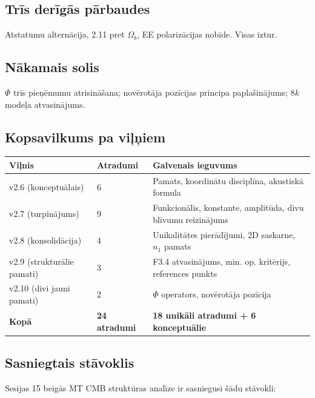 \documentclass[12pt,a4paper]{article}
\begin{document}
\subsection*{Trīs derīgās pārbaudes}

Atstatumu alternācija, 2.11 pret $\Omega_b$, EE polarizācijas nobīde. Visas iztur.

\subsection*{Nākamais solis}

$\Phi$ trīs pieņēmumu atrisināšana; novērotāja pozīcijas principa paplašinājums; $8k$ modeļa atvasinājums.

\subsection*{Kopsavilkums pa viļņiem}

\begin{table}[h]
\centering
\begin{tabular}{|l|l|l|}
\hline
\textbf{Viļnis} & \textbf{Atradumi} & \textbf{Galvenais ieguvums} \\
\hline
v2.6 (konceptuālais) & 6 & Pamats, koordinātu disciplīna, akustiskā formula \\
v2.7 (turpinājums) & 9 & Funkcionālis, konstante, amplitūda, divu blīvumu reizinājums \\
v2.8 (konsolidācija) & 4 & Unikalitātes pierādījumi, 2D saskarne, $n_1$ pamats \\
v2.9 (strukturālie pamati) & 3 & F3.4 atvasinājums, min. op. kritērijs, references punkts \\
v2.10 (divi jauni pamati) & 2 & $\Phi$ operators, novērotāja pozīcija \\
\hline
\textbf{Kopā} & \textbf{24 atradumi} & \textbf{18 unikāli atradumi + 6 konceptuālie} \\
\hline
\end{tabular}
\end{table}

\subsection*{Sasniegtais stāvoklis}

Sesijas 15 beigās MT CMB struktūras analīze ir sasniegusi šādu stāvokli:
\end{document}
